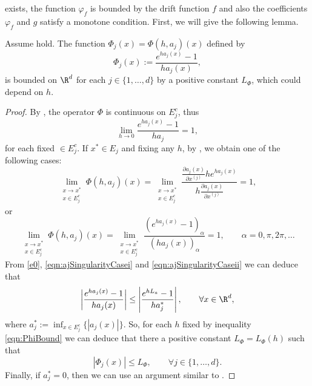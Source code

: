 exists, the function $\varphi_f$ is bounded by the drift function $f$ and also the 
coefficients $\varphi_f$  and $g$  satisfy a monotone condition. First, we will give the following lemma.
\begin{lem}\label{l1}
	Assume  hold. 
	The function $\Phi_j(x)=\Phi(h, a_j)(x)$ 
	defined by
	\begin{equation}\label{eqn:ExpBound}
		\Phi_j(x):=\frac{e^{ha_j(x)}-1}{ha_j(x)},
	\end{equation}
	is bounded  on $\R^d$ for each $j\in \{ 1,\dots, d\}$
	by a positive constant $L_{\Phi}$, which could depend on $h$.
\end{lem}
\begin{proof}    By , the operator $\Phi$ is continuous
	on $E_j^c$, thus 
	\begin{equation}\label{e0}
	\lim_{h\to 0}
	\frac{e^{ha_j(x)}-1}{ha_j}=1,
	\end{equation}
	for each fixed $\in E_j^c$. If $x^*\in E_j$ and fixing any $h$, by , 
	we obtain one of the following cases:
	\begin{equation}\label{eqn:ajSingularityCasei}
	\lim_{
		\substack{
			x \to x^*\\ 
			x\in E_j^c
		}
	}
	\Phi(h,a_j)(x) =
	\lim_{
		\substack{
			x \to x^*\\ 
			x\in E_j^c
		}
	}	
	\frac{\frac{\partial a_j(x)}{\partial x^{(j)}} 
		h e^{h a_j(x)} 
	}{
	h\frac{\partial a_j(x)}{\partial x^{(j)}}
}=1,
\end{equation}	
or
\begin{equation}\label{eqn:ajSingularityCaseii}
\lim_{
	\substack{
		x \to x^*\\ 
		x\in E_j^c
	}
}
\Phi(h,a_j)(x) 
=
%
\lim_{
	\substack{
		x \to x^*\\ 
		x\in E_j^c
	}
}	
\frac{
	\left(
	e^{h a_j(x)} - 1
	\right)_{\alpha}
}{
\left(
h a_j(x)
\right)_{\alpha}
}	=	1, \qquad \alpha = 0,\pi, 2\pi,\dots
\end{equation}	
From \eqref{e0}, \eqref{eqn:ajSingularityCasei} and \eqref{eqn:ajSingularityCaseii} we can deduce that 	
\begin{equation}\label{eqn:PhiBound}
	\left|\frac{e^{ha_j(x)}-1}{ha_j(x)}
	\right|\leq\left|\frac{e^{hL_a}-1}{ha^*_j}
	\right|,
	\qquad \forall x \in \R^d,
\end{equation}
where $a^*_j:= \inf_{x\in E_j^c}\{|a_j(x)|\}$. So, for each $h$ fixed by inequality \eqref{eqn:PhiBound} we can 
deduce that there a positive constant $L_{\Phi}=L_{\Phi}(h)$ such that
$$
	|\Phi_j(x)|\leq L_{\Phi}, \qquad \forall j\in \{1,\dots, d\}.	
$$ 
Finally, if $a^*_j=0$, then we can
use an argument similar to .	
\end{proof}


